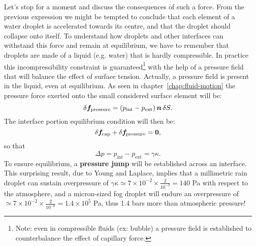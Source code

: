 Let's stop for a moment and discuss the consequences of such a force. From the previous expression we might be tempted to conclude that each element of a water droplet is accelerated towards its centre, and that the droplet should collapse onto itself. To understand how droplets and other interfaces can withstand this force and remain at equilibrium, we have to remember that droplets are made of a liquid (e.g. water) that is hardly compressible. In practice this incompressibility constraint is guaranteed\footnote{Note: even in compressible fluids (ex: bubble) a pressure field is established to counterbalance the effect of capillary force.} with the help of a pressure field that will balance the effect of surface tension. Actually, a pressure field is present in the liquid, even at equilibrium. As seen in chapter~\ref{chap:fluid-motion} the pressure force exerted onto the small considered surface element will be: 
$$
\delta \bff_\text{pressure} = \lp p_\text{int} - p_\text{ext}\rp \bn \,\delta S.
$$
The interface portion equilibrium condition will then be:
\begin{equation}
\delta \bff_\text{cap} + \delta \bff_\text{pressure}  = \boldsymbol 0,
\end{equation}
so that
\begin{equation}
\Delta p = p_\text{int} - p_\text{ext} = \gamma \kappa.
\label{eq:laplace_jump}
\end{equation}
To ensure equilibrium, a \textbf{pressure jump} will be established across an interface. This surprising result, due to Young and Laplace, implies that a millimetric rain droplet can sustain overpressure of $\gamma \kappa \simeq 7 \times 10^{-2} \times \frac{2}{10^{-3}} = 140 $ Pa with respect to the atmosphere, and a micron-sized fog droplet will endure an overpressure of $\simeq 7 \times 10^{-2} \times \frac{2}{10^{-6}} = 1.4\times 10^{5} $ Pa, thus 1.4 bars more than atmospheric pressure!
